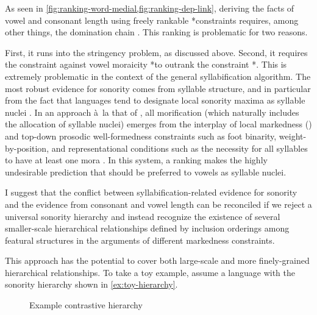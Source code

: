 As seen in \cref{fig:ranking-word-medial,fig:ranking-dep-link}, deriving the facts of vowel and consonant length using freely rankable *\mo constraints requires, among other things, the domination chain \dom{*\mo\ipa{[b~d~ɡ]}}{\dom{*\mo[V]}{*\mo\ipa{[p~t~k]}}}. This ranking is problematic for two reasons.

First, it runs into the stringency problem, as discussed above. Second, it requires the constraint against vowel moraicity *\mo[V] to outrank the constraint *\mo\ipa{[p~t~k]}. This is extremely problematic in the context of the general syllabification algorithm. The most robust evidence for sonority comes from syllable structure, and in particular from the fact that languages tend to designate local sonority maxima as syllable nuclei \citep[\egm][]{dell85:_syllab_imdlaw_tashl_berber,clements90,ot}. In an approach à~la that of \citet{moren01:_distin}, all morification (which naturally includes the allocation of syllable nuclei) emerges from the interplay of local markedness (\ie *\mo[F]) and top\hyp down prosodic well\hyp formedness constraints such as foot binarity, weight\hyp by\hyp position, and representational conditions such as the necessity for all syllables to have at least one mora \citep[\cf also][]{blumenfeld11:_coerc}. In this system, a ranking \dom{*\mo[V]}{*\mo\ipa{[p~t~k]}} makes the highly undesirable prediction that \ipa{[p~t~k]} should be preferred to vowels as syllable nuclei.

I suggest that the conflict between syllabification\hyp related evidence for sonority and the evidence from consonant and vowel length can be reconciled if we reject a universal sonority hierarchy and instead recognize the existence of several smaller\hyp scale hierarchical relationships defined by inclusion orderings among featural structures in the arguments of different markedness constraints.

This approach has the potential to cover both large\hyp scale and more finely\hyp grained hierarchical relationships. To take a toy example, assume a language with the sonority hierarchy shown in \ref{ex:toy-hierarchy}.

\begin{figure}[htp]
  \centering
  \caption{Example contrastive hierarchy}
  \label{fig:toy-ch}
\end{figure}

